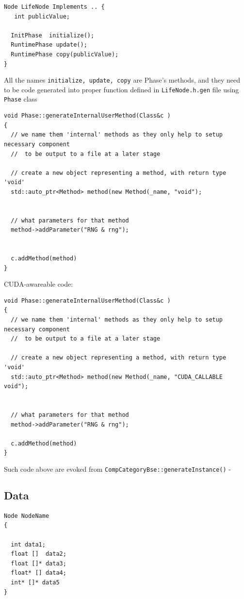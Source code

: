 \begin{verbatim}
Node LifeNode Implements .. {
   int publicValue;
  
  InitPhase  initialize();
  RuntimePhase update();
  RuntimePhase copy(publicValue);
}
\end{verbatim}

All the names \verb!initialize, update, copy! are Phase's methods, and they need to be code generated into proper function defined in 
\verb!LifeNode.h.gen! file using \verb!Phase! class 

\begin{verbatim}
void Phase::generateInternalUserMethod(Class&c )
{
  // we name them 'internal' methods as they only help to setup necessary component
  //  to be output to a file at a later stage
  
  // create a new object representing a method, with return type 'void'
  std::auto_ptr<Method> method(new Method(_name, "void");
  
  
  // what parameters for that method
  method->addParameter("RNG & rng");
  
  
  c.addMethod(method)
}
\end{verbatim}


CUDA-awareable code:
\begin{verbatim}
void Phase::generateInternalUserMethod(Class&c )
{
  // we name them 'internal' methods as they only help to setup necessary component
  //  to be output to a file at a later stage
  
  // create a new object representing a method, with return type 'void'
  std::auto_ptr<Method> method(new Method(_name, "CUDA_CALLABLE void");
  
  
  // what parameters for that method
  method->addParameter("RNG & rng");
  
  c.addMethod(method)
}
\end{verbatim}

Such code above are evoked from 
\verb!CompCategoryBse::generateInstance()! - 




\subsection{Data}

\begin{verbatim}
Node NodeName
{

  int data1;
  float []  data2;
  float []* data3;
  float* [] data4;
  int* []* data5
}
\end{verbatim}

